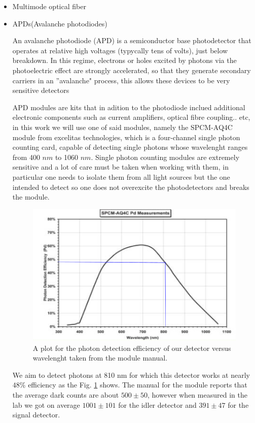\documentclass[12pt]{book}
\begin{document}
\begin{itemize}
\item Multimode optical fiber
\item APDs(Avalanche photodiodes)

An avalanche photodiode (APD) is a semiconductor base photodetector that operates at relative high voltages (typycally tens of volts), just below breakdown. In this regime, electrons or holes excited by photons via the photoelectric effect are strongly accelerated, so that they generate secondary carriers in an ''avalanche" process, this allows these devices to be very sensitive detectors

APD modules are kits that in adition to the photodiode inclued additional electronic components such as current amplifiers, optical fibre coupling.. etc, in this work we will use one of said modules, namely the SPCM-AQ4C module from excelitas technologies, which is a four-channel single photon counting card, capable of detecting single photons whose wavelenght ranges from 400 $nm$ to 1060 $nm$. Single photon counting modules are extremely sensitive and a lot of care must be taken when working with them, in particular one needs to isolate them from all  light sources but the one intended to detect so one does not overexcite the photodetectors and breaks the module.


\begin{figure}[H]
\centering
\includegraphics[scale=1]{images/effiency.png}
\caption{A plot for the photon detection efficiency of our detector versus wavelenght taken from the module manual.}
\label{module}
\end{figure}

We aim to detect photons at 810 nm for which this detector works at nearly $48\%$ efficiency as the Fig. \ref{module} shows. The manual for the module \cite{manual} reports that the average dark counts are about $500\pm 50$, however when measured in the lab we got on average $ 1001 \pm 101$ for the idler detector and $391 \pm 47$ for the signal detector.

\end{itemize}
\end{document}
